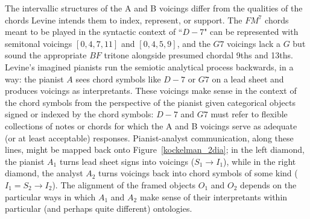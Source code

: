 The intervallic structures of the A and B voicings differ from the qualities of the chords Levine intends them to index, represent, or support.  The $FM^7$ chords meant to be played in the syntactic context of ``$D-7$" can be represented with semitonal voicings $[0,4,7,11]$ and $[0,4,5,9]$, and the $G7$ voicings lack a $G$ but sound the appropriate $BF$ tritone alongside presumed chordal 9ths and 13ths.  Levine's imagined pianists run the semiotic analytical process backwards, in a way: the pianist $A$ sees chord symbols like $D-7$ or $G7$ on a lead sheet and produces voicings as interpretants.  These voicings make sense in the context of the chord symbols from the perspective of the pianist given categorical objects signed or indexed by the chord symbols: $D-7$ and $G7$ must refer to flexible collections of notes or chords for which the A and B voicings serve as adequate (or at least acceptable) responses.  Pianist-analyst communication, along these lines, might be mapped back onto Figure~\ref{kockelman_2dia}; in the left diamond, the pianist $A_1$ turns lead sheet signs into voicings ($S_1 \rightarrow I_1$), while in the right diamond, the analyst $A_2$ turns voicings back into chord symbols of some kind ($I_1 = S_2 \rightarrow I_2$).  The alignment of the framed objects $O_1$ and $O_2$ depends on the particular ways in which $A_1$ and $A_2$ make sense of their interpretants within particular (and perhaps quite different) ontologies.

